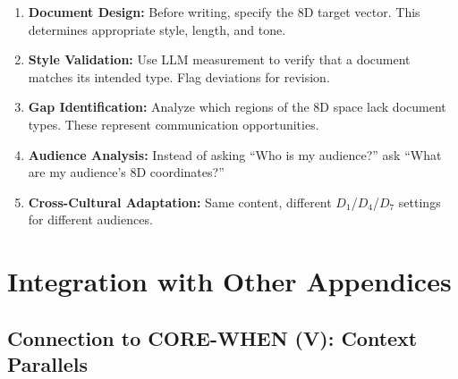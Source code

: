 \begin{tcolorbox}[colback=green!5!white, colframe=green!75!black,
    title=Practical Implications]
\begin{enumerate}
\item \textbf{Document Design:} Before writing, specify the 8D target vector.
      This determines appropriate style, length, and tone.

\item \textbf{Style Validation:} Use LLM measurement to verify that a document
      matches its intended type. Flag deviations for revision.

\item \textbf{Gap Identification:} Analyze which regions of the 8D space lack
      document types. These represent communication opportunities.

\item \textbf{Audience Analysis:} Instead of asking ``Who is my audience?''
      ask ``What are my audience's 8D coordinates?''

\item \textbf{Cross-Cultural Adaptation:} Same content, different $D_1$/$D_4$/$D_7$
      settings for different audiences.
\end{enumerate}
\end{tcolorbox}


\section{Integration with Other Appendices}
\label{sec:doctype-integration}

\subsection{Connection to CORE-WHEN (V): Context Parallels}

